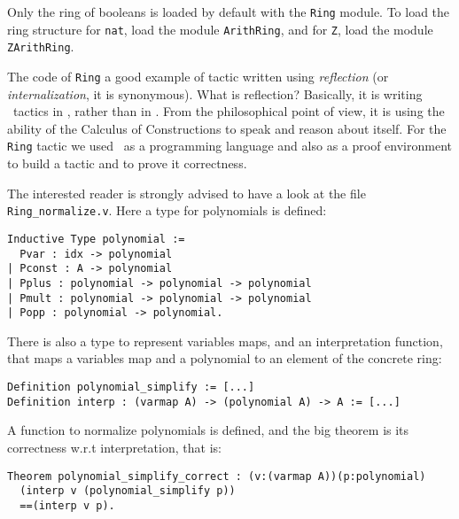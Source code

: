 \Warning Only the ring of booleans is loaded by default with the
\texttt{Ring} module. To load the ring structure for \texttt{nat},
load the module \texttt{ArithRing}, and for \texttt{Z},
load the module \texttt{ZArithRing}.



The code of \texttt{Ring} a good  example of tactic written using
\textit{reflection} (or \textit{internalization}, it is 
synonymous). What is reflection? Basically,  it is writing \Coq\ tactics
in \Coq, rather than in \ocaml. From the philosophical point of view,
it is using the ability of the Calculus of Constructions to speak and
reason about itself.
For the \texttt{Ring} tactic we used 
\Coq\ as a programming language and also as a proof environment to build a
tactic and to prove it correctness.

The interested reader is strongly advised to have a look at the file
\texttt{Ring\_normalize.v}. Here a type for polynomials is defined: 

\begin{small}
\begin{flushleft}
\begin{verbatim}
Inductive Type polynomial := 
  Pvar : idx -> polynomial
| Pconst : A -> polynomial
| Pplus : polynomial -> polynomial -> polynomial
| Pmult : polynomial -> polynomial -> polynomial
| Popp : polynomial -> polynomial.
\end{verbatim}
\end{flushleft}
\end{small}

There is also a type to represent variables maps, and an
interpretation function, that maps a variables map and a polynomial to an
element of the concrete ring:

\begin{small}
\begin{flushleft}
\begin{verbatim}
Definition polynomial_simplify := [...]
Definition interp : (varmap A) -> (polynomial A) -> A := [...]
\end{verbatim}
\end{flushleft}
\end{small}

A function to normalize polynomials is defined, and the big theorem is
its correctness w.r.t interpretation, that is:

\begin{small}
\begin{flushleft}
\begin{verbatim}
Theorem polynomial_simplify_correct : (v:(varmap A))(p:polynomial)
  (interp v (polynomial_simplify p))
  ==(interp v p).
\end{verbatim}
\end{flushleft}
\end{small}

